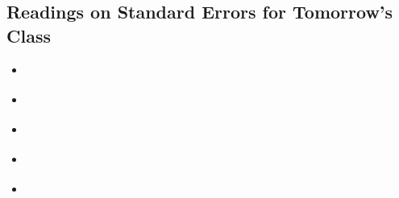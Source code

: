 \documentclass[11pt,leqno]{article}\usepackage[]{graphicx}\usepackage[]{color}
\theoremstyle{newstyle}
\begin{document}
\subsection{Readings on Standard Errors for Tomorrow's Class}

\begin{itemize}

\item \citet[Chapter 3]{gerbergreen2012}

\item \citet[Chapter 6]{dunning2012}

\item \citet[Chapter 33, footnote 11]{fpp2007}

\item \citet{lin2013}

\item \citet{aronowetal2014}

\end{itemize}

\newpage


\begin{singlespace}
\end{singlespace}

\newpage
\end{document}
